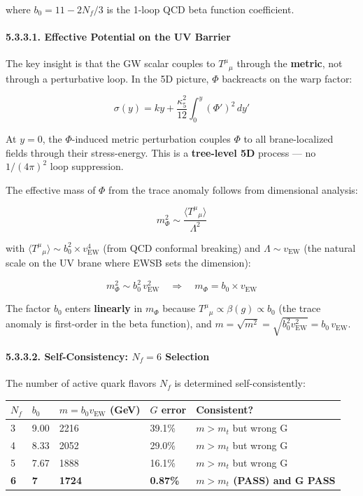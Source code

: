 \documentclass[
  11pt,
]{article}
\begin{document}
where \(b_0 = 11 - 2N_f/3\) is the 1-loop QCD beta function coefficient.

\hypertarget{effective-potential-on-the-uv-barrier}{%
\paragraph{5.3.3.1. Effective Potential on the UV
Barrier}\label{effective-potential-on-the-uv-barrier}}

The key insight is that the GW scalar couples to \(T^\mu{}_{\mu}\)
through the \textbf{metric}, not through a perturbative loop. In the 5D
picture, \(\Phi\) backreacts on the warp factor:

\[\sigma(y) = ky + \frac{\kappa_5^2}{12}\int_0^y (\Phi')^2\,dy' \tag{229}\]

At \(y = 0\), the \(\Phi\)-induced metric perturbation couples \(\Phi\)
to all brane-localized fields through their stress-energy. This is a
\textbf{tree-level 5D} process --- no \(1/(4\pi)^2\) loop suppression.

The effective mass of \(\Phi\) from the trace anomaly follows from
dimensional analysis:

\[m_\Phi^2 \sim \frac{\langle T^\mu{}_{\mu}\rangle}{\Lambda^2} \tag{230}\]

with \(\langle T^\mu{}_{\mu}\rangle \sim b_0^2 \times v_{\text{EW}}^4\)
(from QCD conformal breaking) and \(\Lambda \sim v_{\text{EW}}\) (the
natural scale on the UV brane where EWSB sets the dimension):

\[m_\Phi^2 \sim b_0^2\,v_{\text{EW}}^2 \quad \Longrightarrow \quad \boxed{m_\Phi = b_0 \times v_{\text{EW}}} \tag{231}\]

The factor \(b_0\) enters \textbf{linearly} in \(m_\Phi\) because
\(T^\mu{}_{\mu} \propto \beta(g) \propto b_0\) (the trace anomaly is
first-order in the beta function), and
\(m = \sqrt{m^2} = \sqrt{b_0^2 v_{\text{EW}}^2} = b_0\,v_{\text{EW}}\).

\hypertarget{self-consistency-n_f-6-selection}{%
\paragraph{\texorpdfstring{5.3.3.2. Self-Consistency: \(N_f = 6\)
Selection}{5.3.3.2. Self-Consistency: N\_f = 6 Selection}}\label{self-consistency-n_f-6-selection}}

The number of active quark flavors \(N_f\) is determined
self-consistently:

\begin{longtable}[]{@{}lllll@{}}
\toprule
\(N_f\) & \(b_0\) & \(m = b_0 v_{\text{EW}}\) (GeV) & \(G\) error &
Consistent?\tabularnewline
\midrule
\endhead
3 & 9.00 & 2216 & 39.1\% & \(m > m_t\) but wrong G\tabularnewline
4 & 8.33 & 2052 & 29.0\% & \(m > m_t\) but wrong G\tabularnewline
5 & 7.67 & 1888 & 16.1\% & \(m > m_t\) but wrong G\tabularnewline
\textbf{6} & \textbf{7} & \textbf{1724} & \textbf{0.87\%} &
\textbf{\(m > m_t\) (PASS) and G PASS}\tabularnewline
\bottomrule
\end{longtable}
\end{document}
